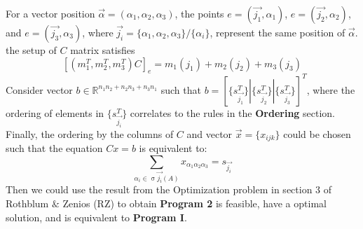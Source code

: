 \documentclass{article}
\begin{document}
For a vector position $\Vec{\alpha} = (\alpha_1, \alpha_2, \alpha_3)$, the points $e = (\Vec{j_1}, \alpha_1)$, $e = (\Vec{j_2}, \alpha_2)$, and $e = ( \Vec{j_3}, \alpha_3)$, where $\Vec{j_i} = \{\alpha_1, \alpha_2, \alpha_3\}/\{\alpha_i\}$, represent the same position of $\Vec{\alpha}$. the setup of $C$ matrix satisfies $$[(m_{1}^{T}, m_{2}^{T}, m_{3}^{T})C]_{e} =m_1(j_1) + m_2(j_2) + m_3(j_3)$$
Consider vector $b \in \mathbb{R}^{n_1n_2+n_2n_3+n_3n_1}$ such that $b = [\{s_{\Vec{j_1}}^{T}\}| \{s_{\Vec{j_2}}^{T}\}| \{s_{\Vec{j_3}}^{T}\}]^{T}$, where the ordering of elements in $\{s_{\Vec{j_i}}^{T}\}$ correlates to the rules in the \textbf{Ordering} section. Finally, the ordering by the columns of $C$ and vector $\Vec{x} = \{x_{ijk}\}$ could be chosen such that the equation $Cx=b$ is equivalent to:
$$\sum\limits_{\alpha_i \in \upsigma{\Vec{j_i}(A)}} x_{\alpha_1\alpha_2\alpha_3} = s_{\Vec{j_i}} $$
Then we could use the result from the Optimization problem in section 3 of Rothblum $\&$ Zenios (RZ) to obtain \textbf{Program 2} is feasible, have a optimal solution, and is equivalent to \textbf{Program I}.
\end{document}
